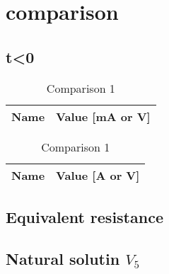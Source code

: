 \section{comparison}
\subsection{t<0}

\begin{table}[h]
\begin{center}
  \begin{tabular}{|c|c|}
    \hline    
    {\bf Name} & {\bf Value [mA or V]} \\ \hline
    
    \hline
  \end{tabular}
  \begin{tabular}{|c||c|}
    \hline    
    {\bf Name} & {\bf Value [A or V]} \\ \hline
    
    \hline
  \end{tabular}
  \caption{Comparison 1}
  \label{tab:comparison 1}
\end{center}
\end{table}
\FloatBarrier

\subsection{Equivalent resistance}

\subsection{Natural solutin $V_5$}



